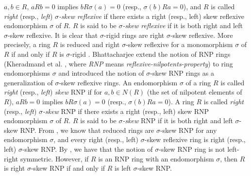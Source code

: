 \documentclass{amsart}
\theoremstyle{definition}
\theoremstyle{remark}
\numberwithin{equation}{section}
\begin{document}
$a, b \in R$, $aRb = 0$ implies $bR\sigma(a) = 0$ (resp., $\sigma(b)Ra = 0$), and $R$ is called \textit{right} (resp., \textit{left}) \textit{$\sigma$-skew reflexive} if there exists a right (resp., left) skew reflexive endomorphism $\sigma$ of $R$. $R$ is said to be \textit{$\sigma$-skew reflexive} if it is both right and left $\sigma$-skew reflexive. It is clear that $\sigma$-rigid rings are right $\sigma$-skew reflexive. More precisely, a ring $R$ is reduced and right $\sigma$-skew reflexive for a monomorphism $\sigma$ of $R$ if and only if $R$ is $\sigma$-rigid \cite[Theorem 2.6]{Kwaketal2014}. Bhattacharjee \cite{Bhattacharjee2020} extend the notion of RNP rings (Kheradmand et al. \cite{Kheradmandetal2017}, where \textit{RNP} means {\em reflexive-nilpotents-property}) to ring endomorphisms $\sigma$ and introduced the notion of $\sigma$-skew RNP rings as a generalization of $\sigma$-skew reflexive rings. An endomorphism $\sigma$ of a ring $R$ is called \textit{right} (resp., \textit{left}) \textit{skew} RNP if for $a, b \in N(R)$ (the set of nilpotent elements of $R$), $aRb = 0$ implies $bR\sigma(a) = 0$ (resp., $\sigma(b)Ra = 0$). A ring $R$ is called \textit{right} (resp., \textit{left}) \textit{$\sigma$-skew} RNP if there exists a right (resp., left) skew RNP endomorphism $\sigma$ of $R$. $R$ is said to be \textit{$\sigma$-skew} RNP if it is both right and left $\sigma$-skew RNP. From \cite[Remark 1.2]{Bhattacharjee2020}, we know that reduced rings are $\sigma$-skew RNP for any endomorphism $\sigma$, and every right (resp., left) $\sigma$-skew reflexive ring is right (resp., left) $\sigma$-skew RNP. By \cite[Example 1.3]{Bhattacharjee2020}, we have that the notion of $\sigma$-skew RNP ring is not left-right symmetric. However, if $R$ is an RNP ring with an endomorphism $\sigma$, then $R$ is right $\sigma$-skew RNP if and only if $R$ is left $\sigma$-skew RNP. 
\end{document}
